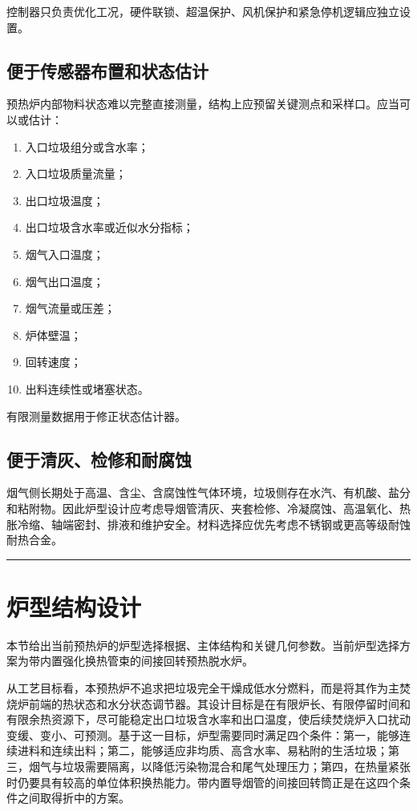 \documentclass[UTF8,openany,zihao=-4,oneside]{ctexbook}
\providecommand{\tightlist}{\setlength{\itemsep}{0pt}\setlength{\parskip}{0pt}}
\newcommand{\manualdivider}{\par\vspace{0.6em}\noindent\textcolor{FGLine}{\rule{\linewidth}{0.7pt}}\vspace{0.6em}\par}
\begin{document}
控制器只负责优化工况，硬件联锁、超温保护、风机保护和紧急停机逻辑应独立设置。

\subsection{便于传感器布置和状态估计}\label{ux4fbfux4e8eux4f20ux611fux5668ux5e03ux7f6eux548cux72b6ux6001ux4f30ux8ba1}

预热炉内部物料状态难以完整直接测量，结构上应预留关键测点和采样口。应当可以或估计：

\begin{enumerate}
\def\labelenumi{\arabic{enumi}.}
\tightlist
\item
  入口垃圾组分或含水率；
\item
  入口垃圾质量流量；
\item
  出口垃圾温度；
\item
  出口垃圾含水率或近似水分指标；
\item
  烟气入口温度；
\item
  烟气出口温度；
\item
  烟气流量或压差；
\item
  炉体壁温；
\item
  回转速度；
\item
  出料连续性或堵塞状态。
\end{enumerate}

有限测量数据用于修正状态估计器。

\subsection{便于清灰、检修和耐腐蚀}\label{ux4fbfux4e8eux6e05ux7070ux68c0ux4feeux548cux8010ux8150ux8680}

烟气侧长期处于高温、含尘、含腐蚀性气体环境，垃圾侧存在水汽、有机酸、盐分和粘附物。因此炉型设计应考虑导烟管清灰、夹套检修、冷凝腐蚀、高温氧化、热胀冷缩、轴端密封、排液和维护安全。材料选择应优先考虑不锈钢或更高等级耐蚀耐热合金。

\manualdivider

\section{炉型结构设计}\label{ux7089ux578bux7ed3ux6784ux8bbeux8ba1}

本节给出当前预热炉的炉型选择根据、主体结构和关键几何参数。当前炉型选择方案为带内置强化换热管束的间接回转预热脱水炉。

从工艺目标看，本预热炉不追求把垃圾完全干燥成低水分燃料，而是将其作为主焚烧炉前端的热状态和水分状态调节器。其设计目标是在有限炉长、有限停留时间和有限余热资源下，尽可能稳定出口垃圾含水率和出口温度，使后续焚烧炉入口扰动变缓、变小、可预测。基于这一目标，炉型需要同时满足四个条件：第一，能够连续进料和连续出料；第二，能够适应非均质、高含水率、易粘附的生活垃圾；第三，烟气与垃圾需要隔离，以降低污染物混合和尾气处理压力；第四，在热量紧张时仍要具有较高的单位体积换热能力。带内置导烟管的间接回转筒正是在这四个条件之间取得折中的方案。
\end{document}
